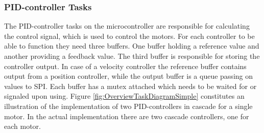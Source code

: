 \documentclass[../../main.tex]{subfiles}
\begin{document}
\subsubsection*{PID-controller Tasks}
The PID-controller tasks on the microcontroller are responsible for calculating the control signal, which is used to control the motors. For each controller to be able to function they need three buffers. One buffer holding a reference value and another providing a feedback value. The third buffer is responsible for storing the controller output. In case of a velocity controller the reference buffer contains output from a position controller, while the output buffer is a queue passing on values to SPI. Each buffer has a mutex attached which needs to be waited for or signaled upon using. Figure \ref{fig:OverviewTaskDiagramSimple} constitutes an illustration of the implementation of two PID-controllers in cascade for a single motor. In the actual implementation there are two cascade controllers, one for each motor.
\end{document}
